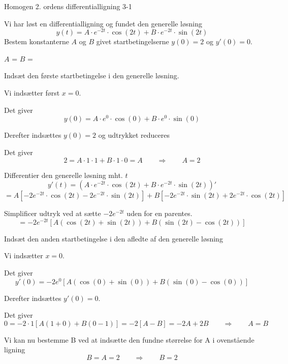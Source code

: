\documentclass{article}
\begin{document}
\begin{exercise}{Homogen 2. ordens differentialligning 3-1}
	
	Vi har løst en differentialligning og fundet den generelle løsning
	\[
	y(t) = A \cdot e^{-2 t}  \cdot \cos(2 t)+ B \cdot e^{-2 t}  \cdot \sin(2 t)
	\]
	Bestem konstanterne $A$ og $B$ givet startbetingelserne $y(0)=2$ og $y'(0)=0$.
	
	
	$A$ = 		
$B$ = 
	
	\hint
	
	Indsæt den første startbetingelse i den generelle løsning. 
	
	
	\hint
	
	Vi indsætter først $x=0$.
	
	\hint
	
	Det giver
	\[
	y(0)=  A \cdot e^{0}  \cdot \cos(0)+ B \cdot e^{0}  \cdot \sin(0)
	\]
	
	\hint
	
	Derefter indsættes $y(0)=2$ og udtrykket reduceres
	
	\hint 
	
	Det giver 
	\[
	2= A \cdot 1  \cdot 1+ B \cdot 1  \cdot 0  = A \qquad \Rightarrow \qquad A = 2
	\]
	
	\hint 
	
	Differentier den generelle løsning mht. $t$
	\[
	y'(t) = \left(A \cdot e^{-2 t}  \cdot \cos(2 t)+ B \cdot e^{-2 t}  \cdot \sin(2 t)\right)' 
	\]
	\[
		= A \left[-2 e^{-2t} \cdot \cos(2t) - 2e^{-2t} \cdot \sin(2t) \right] + B \left[ -2 e^{-2t} \cdot \sin(2t) + 2e^{-2t} \cdot \cos(2t) \right] 
		\]
	
	\hint
	
	Simplificer udtryk ved at sætte $-2 e^{-2t}$ uden for en parentes.
	\[
	= - 2 e^{-2t} \left[ A (\cos(2t)+\sin(2t)) + B (\sin(2t) -\cos(2t))   \right]
	\]
	
	\hint 
	
	Indsæt den anden startbetingelse i den afledte af den generelle løsning
	
	\hint
	
	Vi indsætter $x=0$.
	
	\hint 
	
	Det giver
	\[
	y'(0) = - 2 e^{0} \left[ A (\cos(0)+\sin(0)) + B (\sin(0) -\cos(0))   \right]
	\]
	
	\hint 
	
	Derefter indsættes $y'(0)=0$.	
	\hint
	
	Det giver
	\[
	0 = - 2 \cdot 1 \left[ A (1+0) + B (0 -1)   \right] = - 2\left[ A -B    \right] = -2 A + 2B \qquad \Rightarrow \qquad A = B
	\]
	
	\hint 
	
	Vi kan nu bestemme B ved at indsætte den fundne størrelse for A i ovenstående ligning
	\[
	B = A = 2 \qquad \Rightarrow \qquad B = 2
	\]

	
\end{exercise}
\end{document}
